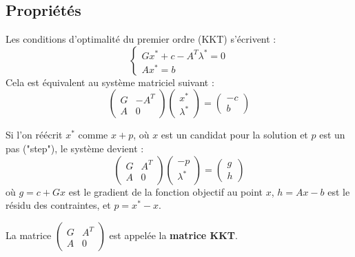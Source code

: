 \subsection{Propriétés}

Les conditions d'optimalité du premier ordre (KKT) s'écrivent :
\begin{equation}
    \begin{cases}
        G x^* + c - A^T \lambda^* = 0 \\
        A x^* = b
    \end{cases}
\end{equation}
Cela est équivalent au système matriciel suivant :
\begin{equation}
    \begin{pmatrix}
        G & -A^T \\
        A & 0
    \end{pmatrix}
    \begin{pmatrix}
        x^* \\
        \lambda^*
    \end{pmatrix}
    =
    \begin{pmatrix}
        -c \\
        b
    \end{pmatrix}
\end{equation}

\begin{remarque}
    Si l'on réécrit $x^*$ comme $x + p$, où $x$ est un candidat pour la solution et $p$ est un pas ("step"), le système devient :
    \begin{equation}
        \begin{pmatrix}
            G & A^T \\
            A & 0
        \end{pmatrix}
        \begin{pmatrix}
            -p \\
            \lambda^*
        \end{pmatrix}
        =
        \begin{pmatrix}
            g \\
            h
        \end{pmatrix}
    \end{equation}
    où $g = c + Gx$ est le gradient de la fonction objectif au point $x$, $h = Ax - b$ est le résidu des contraintes, et $p = x^* - x$.
    
    La matrice $\begin{pmatrix} G & A^T \\ A & 0 \end{pmatrix}$ est appelée la \textbf{matrice KKT}.
\end{remarque}

